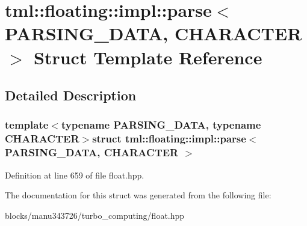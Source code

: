 \hypertarget{structtml_1_1floating_1_1impl_1_1parse}{\section{tml\+:\+:floating\+:\+:impl\+:\+:parse$<$ P\+A\+R\+S\+I\+N\+G\+\_\+\+D\+A\+T\+A, C\+H\+A\+R\+A\+C\+T\+E\+R $>$ Struct Template Reference}
\label{structtml_1_1floating_1_1impl_1_1parse}
}


\subsection{Detailed Description}
\subsubsection*{template$<$typename P\+A\+R\+S\+I\+N\+G\+\_\+\+D\+A\+T\+A, typename C\+H\+A\+R\+A\+C\+T\+E\+R$>$struct tml\+::floating\+::impl\+::parse$<$ P\+A\+R\+S\+I\+N\+G\+\_\+\+D\+A\+T\+A, C\+H\+A\+R\+A\+C\+T\+E\+R $>$}



Definition at line 659 of file float.\+hpp.



The documentation for this struct was generated from the following file\+:\begin{DoxyCompactItemize}
\item 
blocks/manu343726/turbo\+\_\+computing/float.\+hpp\end{DoxyCompactItemize}

